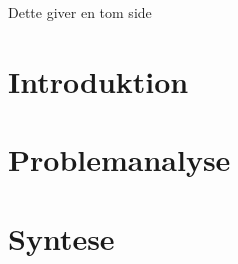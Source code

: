 


\raggedbottom



\frontmatter
%

\clearpage
\thispagestyle{empty}
{\color{white}Dette giver en tom side}
\clearpage


%

\tableofcontents* 

\mainmatter

\chapter{Introduktion}\vspace{-.75cm}

\chapter{Problemanalyse}\vspace{-.75cm}





\cleardoublepage
\chapter{Syntese}\vspace{-.75cm}
%

\begingroup
\label{litteraturliste}
\raggedright


\endgroup
\begin{appendices}
%	
%	
\end{appendices}


